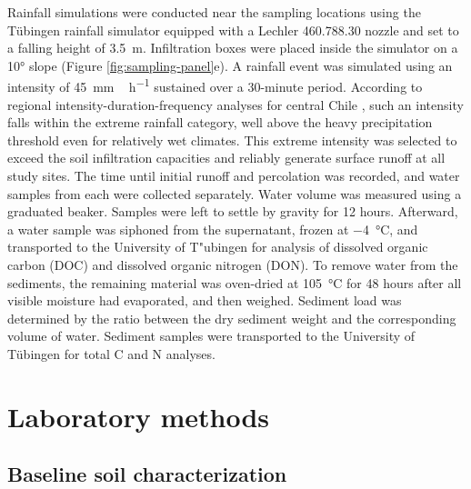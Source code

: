 Rainfall simulations were conducted near the sampling locations using the T\"ubingen rainfall simulator \citep{Iserloh2013,Seitz2015} equipped with a Lechler 460.788.30 nozzle and set to a falling height of \SI{3.5}{\meter}. Infiltration boxes were placed inside the simulator on a \ang{10} slope (Figure \ref{fig:sampling-panel}e). A rainfall event was simulated using an intensity of \SI{45}{\milli\metre\,\hour^{-1}} sustained over a 30-minute period. According to regional intensity-duration-frequency analyses for central Chile \citep{PizarroTapia2020}, such an intensity falls within the extreme rainfall category, well above the heavy precipitation threshold even for relatively wet climates. This extreme intensity was selected to exceed the soil infiltration capacities and reliably generate surface runoff at all study sites. The time until initial runoff and percolation was recorded, and water samples from each were collected separately. Water volume was measured using a graduated beaker. Samples were left to settle by gravity for 12 hours. Afterward, a water sample was siphoned from the supernatant, frozen at \SI{-4}{\celsius}, and transported to the University of T"ubingen for analysis of dissolved organic carbon (DOC) and dissolved organic nitrogen (DON). To remove water from the sediments, the remaining material was oven-dried at \SI{105}{\celsius} for 48 hours after all visible moisture had evaporated, and then weighed. Sediment load was determined by the ratio between the dry sediment weight and the corresponding volume of water. Sediment samples were transported to the University of T\"ubingen for total C and N analyses. 

\section{Laboratory methods}
\subsection{Baseline soil characterization}


